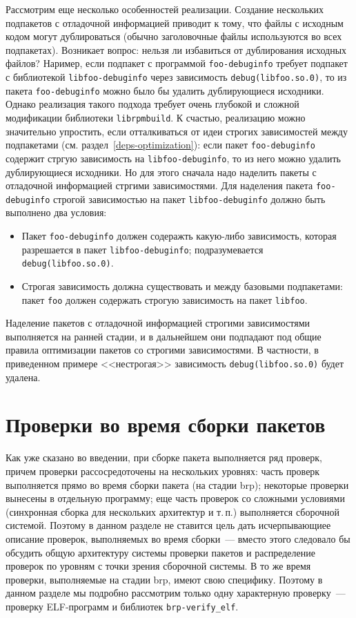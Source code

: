 \documentclass[russian,a4paper,12pt,titlepage]{article}
\begin{document}
Рассмотрим еще несколько особенностей реализации.  Создание нескольких подпакетов с отладочной информацией приводит к тому,
что файлы с исходным кодом могут дублироваться (обычно заголовочные файлы используются во всех подпакетах).  Возникает вопрос:
нельзя ли избавиться от дублирования исходных файлов?  Наример, если подпакет с программой \verb|foo-debuginfo| требует
подпакет с библиотекой \verb|libfoo-debuginfo| через зависимость \verb|debug(libfoo.so.0)|, то из пакета \verb|foo-debuginfo|
можно было бы удалить дублирующиеся исходники.  Однако реализация такого подхода требует очень глубокой и сложной модификации
библиотеки \verb|librpmbuild|.  К счастью, реализацию можно значительно упростить, если отталкиваться от идеи строгих зависимостей
между подпакетами (см. раздел~\ref{deps-optimization}): если пакет \verb|foo-debuginfo| содержит стргую зависимость на
\verb|libfoo-debuginfo|, то из него можно удалить дублирующиеся исходники.  Но для этого сначала надо наделить
пакеты с отладочной информацией стргими зависимостями.  Для наделения пакета \verb|foo-debuginfo| строгой зависимостью
на пакет \verb|libfoo-debuginfo| должно быть выполнено два условия:
\begin{itemize}
\item Пакет \verb|foo-debuginfo| должен содеражть какую-либо зависимость, которая разрешается в пакет \verb|libfoo-debuginfo|;
подразумевается \verb|debug(libfoo.so.0)|.
\item Строгая зависимость должна существовать и между базовыми подпакетами: пакет \verb|foo| должен содержать строгую зависимость
на пакет \verb|libfoo|.
\end{itemize}

Наделение пакетов с отладочной информацией строгими зависимостями выполняется на ранней стадии, и в дальнейшем
они подпадают под общие правила оптимизации пакетов со строгими зависимостями.  В частности, в приведенном
примере <<нестрогая>> зависимость \verb|debug(libfoo.so.0)| будет удалена.

\section{Проверки во время сборки пакетов}
\label{brp-verify}
Как уже сказано во введении, при сборке пакета выполняется ряд проверк, причем проверки рассосредоточены на нескольких уровнях:
часть проверк выполняется прямо во время сборки пакета (на стадии brp); некоторые проверки вынесены в отдельную программу; еще
часть проверок со сложными условиями (синхронная сборка для нескольких архитектур и т.\,п.) выполняется сборочной системой.
Поэтому в данном разделе не ставится цель дать исчерпывающиее описание проверок, выполняемых во время сборки~--- вместо этого
следовало бы обсудить общую архитектуру системы проверки пакетов и распределение проверок по уровням с точки зрения сборочной
системы.  В то же время проверки, выполняемые на стадии brp, имеют свою специфику.  Поэтому в данном разделе мы подробно рассмотрим
только одну характерную проверку~--- проверку ELF-программ и библиотек \verb|brp-verify_elf|.
\end{document}
